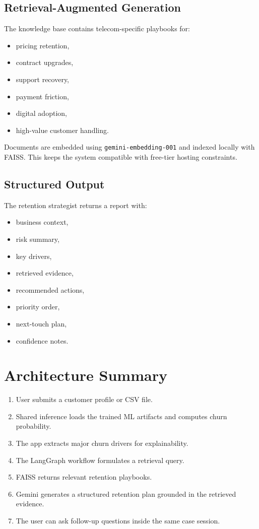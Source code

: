 \documentclass[12pt]{article}
\begin{document}
\subsection{Retrieval-Augmented Generation}
The knowledge base contains telecom-specific playbooks for:
\begin{itemize}
    \item pricing retention,
    \item contract upgrades,
    \item support recovery,
    \item payment friction,
    \item digital adoption,
    \item high-value customer handling.
\end{itemize}

Documents are embedded using \texttt{gemini-embedding-001} and indexed locally with FAISS. This keeps the system compatible with free-tier hosting constraints.

\subsection{Structured Output}
The retention strategist returns a report with:
\begin{itemize}
    \item business context,
    \item risk summary,
    \item key drivers,
    \item retrieved evidence,
    \item recommended actions,
    \item priority order,
    \item next-touch plan,
    \item confidence notes.
\end{itemize}

\section{Architecture Summary}
\begin{enumerate}
    \item User submits a customer profile or CSV file.
    \item Shared inference loads the trained ML artifacts and computes churn probability.
    \item The app extracts major churn drivers for explainability.
    \item The LangGraph workflow formulates a retrieval query.
    \item FAISS returns relevant retention playbooks.
    \item Gemini generates a structured retention plan grounded in the retrieved evidence.
    \item The user can ask follow-up questions inside the same case session.
\end{enumerate}
\end{document}
